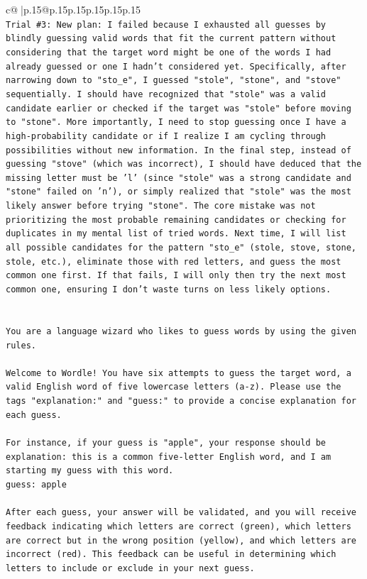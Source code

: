 \documentclass{article}
\begin{document}
{\begin{supertabular}{c@{$\;$}|p{.15\linewidth}@{}p{.15\linewidth}p{.15\linewidth}p{.15\linewidth}p{.15\linewidth}p{.15\linewidth}}
{{{\\ 
\texttt{Trial \#3: New plan: I failed because I exhausted all guesses by blindly guessing valid words that fit the current pattern without considering that the target word might be one of the words I had already guessed or one I hadn't considered yet. Specifically, after narrowing down to "sto\_e", I guessed "stole", "stone", and "stove" sequentially. I should have recognized that "stole" was a valid candidate earlier or checked if the target was "stole" before moving to "stone". More importantly, I need to stop guessing once I have a high{-}probability candidate or if I realize I am cycling through possibilities without new information. In the final step, instead of guessing "stove" (which was incorrect), I should have deduced that the missing letter must be 'l' (since "stole" was a strong candidate and "stone" failed on 'n'), or simply realized that "stole" was the most likely answer before trying "stone". The core mistake was not prioritizing the most probable remaining candidates or checking for duplicates in my mental list of tried words. Next time, I will list all possible candidates for the pattern "sto\_e" (stole, stove, stone, stole, etc.), eliminate those with red letters, and guess the most common one first. If that fails, I will only then try the next most common one, ensuring I don't waste turns on less likely options.} \\
\\ 
\\ 
\texttt{You are a language wizard who likes to guess words by using the given rules.} \\
\\ 
\texttt{Welcome to Wordle! You have six attempts to guess the target word, a valid English word of five lowercase letters (a{-}z). Please use the tags "explanation:" and "guess:" to provide a concise explanation for each guess.} \\
\\ 
\texttt{For instance, if your guess is "apple", your response should be} \\
\texttt{explanation: this is a common five{-}letter English word, and I am starting my guess with this word.} \\
\texttt{guess: apple} \\
\\ 
\texttt{After each guess, your answer will be validated, and you will receive feedback indicating which letters are correct (green), which letters are correct but in the wrong position (yellow), and which letters are incorrect (red). This feedback can be useful in determining which letters to include or exclude in your next guess.} \\
}}}
\end{supertabular}}
\end{document}
